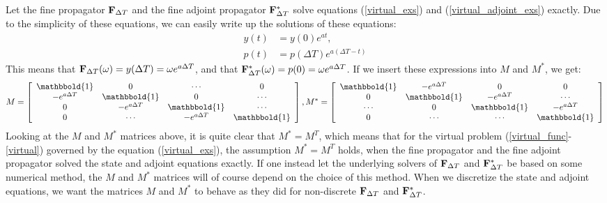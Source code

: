 \\
\\
Let the fine propagator $\bold F_{\Delta T}$ and the fine adjoint propagator $\bold F_{\Delta T}^*$ solve equations (\ref{virtual_exs}) and (\ref{virtual_adjoint_exs}) exactly. Due to the simplicity of these equations, we can easily write up the solutions of these equations:
\begin{align}
y(t)&=y(0)e^{at}, \\
p(t)&=p(\Delta T) e^{a(\Delta T-t)}
\end{align} 
This means that $\bold F_{\Delta T}(\omega)=y(\Delta T)=\omega e^{a\Delta T}$, and that $\bold F_{\Delta T}^*(\omega)=p(0)=\omega e^{a\Delta T}$. If we insert these expressions into $M$ and $M^*$, we get:
\begin{align*}
M = \left[ \begin{array}{cccc}
   \mathbbold{1} & 0 & \cdots & 0 \\  
   -e^{a\Delta T} & \mathbbold{1} & 0 & \cdots \\ 
   0 &-e^{a\Delta T} & \mathbbold{1}  & \cdots \\
   0 &\cdots &-e^{a\Delta T} & \mathbbold{1}  \\
   \end{array}  \right],
M^* =\left[ \begin{array}{cccc}
   	\mathbbold{1} & - e^{a\Delta T} & 0 & 0 \\  
  	 0 & \mathbbold{1} & - e^{a\Delta T} & \cdots \\ 
  	 \cdots &0 &  \mathbbold{1} & - e^{a\Delta T} \\
  	 0 &\cdots &\cdots &  \mathbbold{1}  \\
  	 \end{array}  \right]
\end{align*}
Looking at the $M$ and $M^*$ matrices above, it is quite clear that $M^*=M^T$, which means that for the virtual problem (\ref{virtual_func}-\ref{virtual}) governed by the equation (\ref{virtual_exs}), the assumption $M^*=M^T$ holds, when the fine propagator and the fine adjoint propagator solved the state and adjoint equations exactly. If one instead let the underlying solvers of $\bold F_{\Delta T}$ and $\bold F_{\Delta T}^*$ be based on some numerical method, the $M$ and $M^*$ matrices will of course depend on the choice of this method. When we discretize the state and adjoint equations, we want the matrices $M$ and $M^*$ to behave as they did for non-discrete $\bold F_{\Delta T}$ and $\bold F_{\Delta T}^*$.
\\
